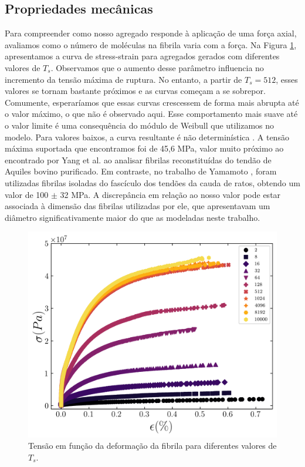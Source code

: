 \documentclass{article}
\begin{document}
\subsection{Propriedades mecânicas}

Para compreender como nosso agregado responde à aplicação de uma força axial, avaliamos como o número de 
moléculas na fibrila varia com a força. Na Figura \ref{R5}, apresentamos a curva de stress-strain para agregados 
gerados com diferentes valores de \(T_{s}\). Observamos que o aumento desse parâmetro influencia no incremento da 
tensão máxima de ruptura. No entanto, a partir de \(T_{s} = 512\), esses valores se tornam bastante próximos e as 
curvas começam a se sobrepor. Comumente, esperaríamos que essas curvas crescessem de forma mais abrupta até o valor
máximo, o que não é observado aqui. Esse comportamento mais suave até o valor limite é uma consequência do módulo 
de Weibull que utilizamos no modelo. Para valores baixos, a curva resultante é não determinística 
\cite{Parkinson1997}. A tensão máxima suportada que encontramos foi de 45,6 MPa, valor muito próximo ao encontrado 
por Yang et al. \cite{YANG2012148} ao analisar fibrilas reconstituídas do tendão de Aquiles bovino purificado. 
Em contraste, no trabalho de Yamamoto \cite{Noritaka}, foram utilizadas fibrilas isoladas do fascículo dos tendões 
da cauda de ratos, obtendo um valor de 100 \(\pm\) 32 MPa. A discrepância em relação ao nosso valor pode estar 
associada à dimensão das fibrilas utilizadas por ele, que apresentavam um diâmetro significativamente maior do que 
as modeladas neste trabalho.

\begin{figure}[H]
    \centering
    \includegraphics[width=\textwidth]{figures/stress_strain.png}

    \caption{Tensão em função da deformação da fibrila para diferentes valores de $T_{s}$.} 

    \label{R5}
\end{figure}
\end{document}
